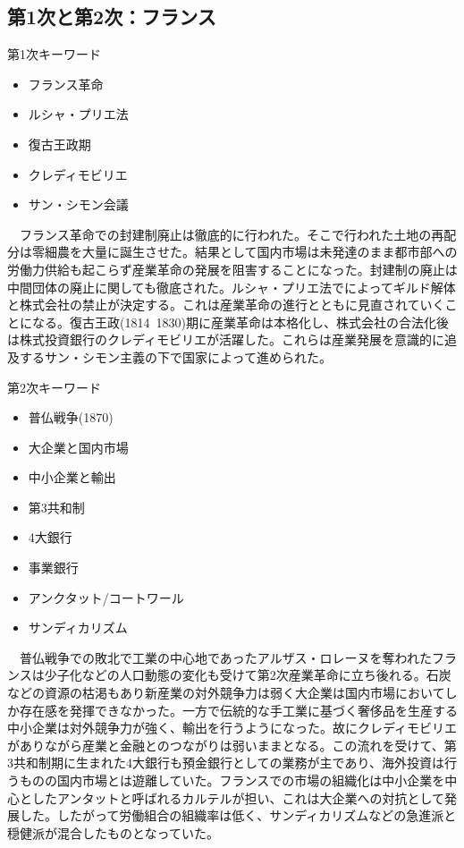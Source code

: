 \documentclass{jsarticle}
\begin{document}
\subsection{第1次と第2次：フランス}
第1次キーワード
\begin{itemize}
\item フランス革命
\item ルシャ・プリエ法
\item 復古王政期
\item クレディモビリエ
\item サン・シモン会議
\end{itemize}
　フランス革命での封建制廃止は徹底的に行われた。そこで行われた土地の再配分は零細農を大量に誕生させた。結果として国内市場は未発達のまま都市部への労働力供給も起こらず産業革命の発展を阻害することになった。封建制の廃止は中間団体の廃止に関しても徹底された。ルシャ・プリエ法でによってギルド解体と株式会社の禁止が決定する。これは産業革命の進行とともに見直されていくことになる。復古王政(1814~1830)期に産業革命は本格化し、株式会社の合法化後は株式投資銀行のクレディモビリエが活躍した。これらは産業発展を意識的に追及するサン・シモン主義の下で国家によって進められた。

第2次キーワード
\begin{itemize}
\item 普仏戦争(1870)
\item 大企業と国内市場
\item 中小企業と輸出
\item 第3共和制
\item 4大銀行
\item 事業銀行
\item アンクタット/コートワール
\item サンディカリズム
\end{itemize}
　普仏戦争での敗北で工業の中心地であったアルザス・ロレーヌを奪われたフランスは少子化などの人口動態の変化も受けて第2次産業革命に立ち後れる。石炭などの資源の枯渇もあり新産業の対外競争力は弱く大企業は国内市場においてしか存在感を発揮できなかった。一方で伝統的な手工業に基づく奢侈品を生産する中小企業は対外競争力が強く、輸出を行うようになった。故にクレディモビリエがありながら産業と金融とのつながりは弱いままとなる。この流れを受けて、第3共和制期に生まれた4大銀行も預金銀行としての業務が主であり、海外投資は行うものの国内市場とは遊離していた。フランスでの市場の組織化は中小企業を中心としたアンタットと呼ばれるカルテルが担い、これは大企業への対抗として発展した。したがって労働組合の組織率は低く、サンディカリズムなどの急進派と穏健派が混合したものとなっていた。
\end{document}
